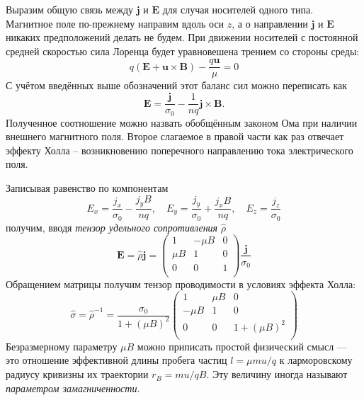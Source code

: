 \documentclass[a4paper,12pt]{article}
\begin{document}
Выразим общую связь между $\mathbf{j}$ и $\mathbf{E}$ для случая носителей одного типа. Магнитное поле по-прежнему направим вдоль оси $z$, а о направлении $\mathbf{j}$ и $\mathbf{E}$ никаких предположений делать не будем. При движении носителей с постоянной средней скоростью сила Лоренца будет уравновешена трением со стороны среды:
\[q(\mathbf{E} + \mathbf{u} \times \mathbf{B}) - \frac{q \mathbf{u}}{\mu} = 0\]
С учётом введённых выше обозначений этот баланс сил можно переписать как
\[\mathbf{E} = \frac{\mathbf{j}}{\sigma_0} - \frac{1}{nq} \mathbf{j} \times \mathbf{B}.\]
Полученное соотношение можно назвать обобщённым законом Ома при наличии внешнего магнитного поля. Второе слагаемое в правой части как раз отвечает эффекту Холла -- возникновению поперечного направлению тока электрического поля.

Записывая равенство по компонентам
\[E_x = \frac{j_x}{\sigma_0} - \frac{j_y B}{nq}, \quad E_y = \frac{j_y}{\sigma_0} + \frac{j_x B}{nq}, \quad E_z = \frac{j_z}{\sigma_0}\]
получим, вводя \textit{тензор удельного сопротивления} $\hat{\rho}$
\begin{equation}
    \mathbf{E} = \hat{\rho} \mathbf{j} = \begin{pmatrix}
                                        1 & -\mu B & 0 \\
                                        \mu B & 1 & 0 \\
                                        0 & 0 & 1\\
    \end{pmatrix} \frac{\mathbf{j}}{\sigma_0}
\end{equation}
Обращением матрицы получим тензор проводимости в условиях эффекта Холла:
\begin{equation}
    \hat{\sigma} = \hat{\rho}^{-1} = \frac{\sigma_0}{1 + (\mu B)^2} \begin{pmatrix}
        1 & \mu B & 0\\
        -\mu B & 1 & 0\\
        0 & 0 & 1 + (\mu B)^2\\
    \end{pmatrix}
\end{equation}
Безразмерному параметру $\mu B$ можно приписать простой физический смысл — это отношение эффективной длины пробега частиц $l = \mu m u / q$ к ларморовскому радиусу кривизны их траектории $r_B = m u / q B$. Эту величину иногда называют \textit{параметром замагниченности}.
\end{document}
